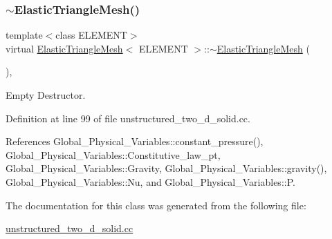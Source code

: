 \mbox{\label{classElasticTriangleMesh_ade80b912f1bb791e5f4fac35abf90504}} 
\subsubsection{\texorpdfstring{$\sim$\+Elastic\+Triangle\+Mesh()}{~ElasticTriangleMesh()}}
{\footnotesize\ttfamily template$<$class E\+L\+E\+M\+E\+NT$>$ \\
virtual \hyperlink{classElasticTriangleMesh}{Elastic\+Triangle\+Mesh}$<$ E\+L\+E\+M\+E\+NT $>$\+::$\sim$\hyperlink{classElasticTriangleMesh}{Elastic\+Triangle\+Mesh} (\begin{DoxyParamCaption}{ }\end{DoxyParamCaption})\hspace{0.3cm}{\ttfamily [inline]}, {\ttfamily [virtual]}}



Empty Destructor. 



Definition at line 99 of file unstructured\+\_\+two\+\_\+d\+\_\+solid.\+cc.



References Global\+\_\+\+Physical\+\_\+\+Variables\+::constant\+\_\+pressure(), Global\+\_\+\+Physical\+\_\+\+Variables\+::\+Constitutive\+\_\+law\+\_\+pt, Global\+\_\+\+Physical\+\_\+\+Variables\+::\+Gravity, Global\+\_\+\+Physical\+\_\+\+Variables\+::gravity(), Global\+\_\+\+Physical\+\_\+\+Variables\+::\+Nu, and Global\+\_\+\+Physical\+\_\+\+Variables\+::P.



The documentation for this class was generated from the following file\+:\begin{DoxyCompactItemize}
\item 
\hyperlink{unstructured__two__d__solid_8cc}{unstructured\+\_\+two\+\_\+d\+\_\+solid.\+cc}\end{DoxyCompactItemize}
